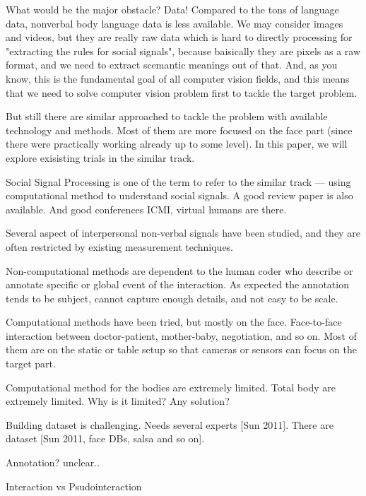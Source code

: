What would be the major obstacle? Data! Compared to the tons of language data, nonverbal body language data is less available. We may consider images and videos, but they are really raw data which is hard to directly processing for "extracting the rules for social signals", because baisically they are pixels as a raw format, and we need to extract scemantic meanings out of that. And, as you know, this is the fundamental goal of all computer vision fields, and this means that we need to solve computer vision problem first to tackle the target problem. 

But still there are similar approached to tackle the problem with available technology and methods. Most of them are more focused on the face part (since there were practically working already up to some level). In this paper, we will explore exisisting trials in the similar track. 



Social Signal Processing is one of the term to refer to the similar track --- using computational method to understand social signals. A good review paper is also available. And good conferences ICMI, virtual humans are there. 




Several aspect of interpersonal non-verbal signals have been studied, and they are often restricted by existing measurement techniques. 


Non-computational methods are dependent to the human coder who describe or annotate specific or global event of the interaction. As expected the annotation tends to be subject, cannot capture enough details, and not easy to be scale. 


Computational methods have been tried, but mostly on the face. Face-to-face interaction between doctor-patient, mother-baby, negotiation, and so on. Most of them are on the static or table setup so that cameras or sensors can focus on the target part. 




Computational method for the bodies are extremely limited. Total body are extremely limited. Why is it limited? Any solution?



Building dataset is challenging. Needs several experts [Sun 2011]. 
There are dataset [Sun 2011, face DBs, salsa and so on]. 

Annotation? unclear..


Interaction vs Psudointeraction










